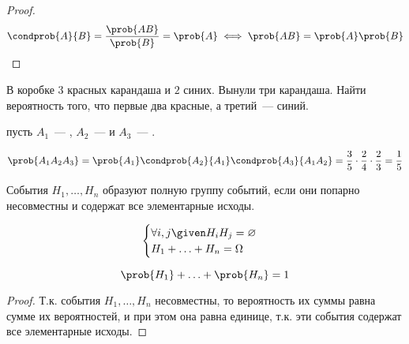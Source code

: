 \begin{proof}
  \begin{equation*}
    \condprob{A}{B}
    = \frac{\prob{A B}}{\prob{B}}
    =  \prob{A}
    \iff
    \prob{A B} = \prob{A} \prob{B}
  \end{equation*}
\end{proof}

\begin{example}
  В коробке \(3\) красных карандаша и \(2\) синих. Вынули три карандаша. Найти
  вероятность того, что первые два красные, а третий~--- синий.

  \solution{} пусть \(A_1\)~--- , \(A_2\)~---
   и \(A_3\)~--- .

  \begin{equation*}
    \prob{A_1 A_2 A_3}
    = \prob{A_1} \condprob{A_2}{A_1} \condprob{A_3}{A_1 A_2}
    = \frac{3}{5} \cdot \frac{2}{4} \cdot \frac{2}{3}
    = \frac{1}{5}
  \end{equation*}
\end{example}



\begin{definition}
  События \(H_1, \dotsc, H_n\) образуют полную группу событий, если они попарно
  несовместны и содержат все элементарные исходы.

  \begin{equation*}
    \begin{cases}
      \forall i, j \given H_i H_j = \varnothing \\
      H_1 + \dotsc + H_n = \Omega
    \end{cases}
  \end{equation*}
\end{definition}

\begin{corollary}
  \begin{equation*}
    \prob{H_1} + \dotsc + \prob{H_n} = 1
  \end{equation*}
\end{corollary}

\begin{proof}
  Т.к. события \(H_1, \dotsc, H_n\) несовместны, то вероятность их суммы равна
  сумме их вероятностей, и при этом она равна единице, т.к. эти события содержат
  все элементарные исходы.
\end{proof}

